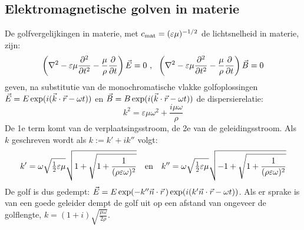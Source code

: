 \subsection{Elektromagnetische golven in materie}
De golfvergelijkingen in materie, met $c_{\rm mat}=(\varepsilon\mu)^{-1/2}$
de lichtsnelheid in materie, zijn:
\[
\left(\nabla^2-\varepsilon\mu\frac{\partial^2 }{\partial t^2}-\frac{\mu}{\rho}\frac{\partial }{\partial t}\right)\vec{E}=0~,~~
\left(\nabla^2-\varepsilon\mu\frac{\partial^2 }{\partial t^2}-\frac{\mu}{\rho}\frac{\partial }{\partial t}\right)\vec{B}=0
\]
geven, na substitutie van de monochromatische vlakke golfoplossingen
$\vec{E}=E\exp(i(\vec{k}\cdot\vec{r}-\omega t))$ en
$\vec{B}=B\exp(i(\vec{k}\cdot\vec{r}-\omega t))$ de dispersierelatie:
\[
k^2=\varepsilon\mu\omega^2+\frac{i\mu\omega}{\rho}
\]
De 1e term komt van de verplaatsingsstroom, de 2e van de geleidingsstroom.
Als $k$ geschreven wordt als $k:=k'+ik''$ volgt:
\[
k'=\omega\sqrt{\mbox{$\frac{1}{2}$}\varepsilon\mu}\sqrt{1+\sqrt{1+\frac{1}{(\rho\varepsilon\omega)^2}}}~~~\mbox{en}~~~
k''=\omega\sqrt{\mbox{$\frac{1}{2}$}\varepsilon\mu}\sqrt{-1+\sqrt{1+\frac{1}{(\rho\varepsilon\omega)^2}}}
\]
De golf is dus gedempt: $\vec{E}=E\exp(-k''\vec{n}\cdot\vec{r}\,)\exp(i(k'\vec{n}\cdot\vec{r}-\omega t))$.
Als er sprake is van een goede geleider dempt de golf uit op een afstand van
ongeveer de golflengte, $\displaystyle k=(1+i)\sqrt{\frac{\mu\omega}{2\rho}}$.

